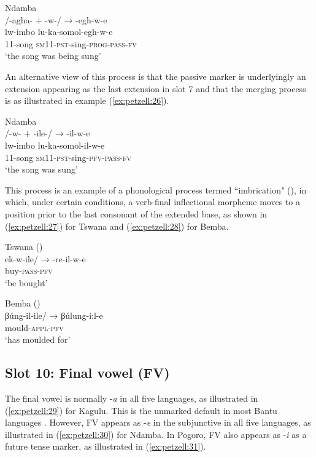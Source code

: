 \documentclass[output=paper,
            colorlinks, citecolor=brown
            ,draftmode
		  ]{langscibook}
\begin{document}
\ex\label{ex:petzell:25}Ndamba\\
{{/}}{}-agha- + -w-{{/}} → {}-egh-w-e   \\
\gll lw-imbo    lu-ka-somol-egh-w-e\\
11-song    \textsc{sm}11-\textsc{pst}{}-sing-\textsc{prog}{}-\textsc{pass}{}-\textsc{fv}\\
\glt `the song was being sung'
\z


{An alternative view of this process is that the passive marker is underlyingly an extension appearing as the last extension in slot 7 and that the merging process is as illustrated in example (\ref{ex:petzell:26}).}


\ea\label{ex:petzell:26}Ndamba\\
{{/}}{}-w- + -ile-{{/} }→ {}-il-w-e   \\
\gll lw-imbo  lu-ka-somol-il-w-e\\
11-song  \textsc{sm}11-\textsc{pst}{}-sing-\textsc{pfv}{}-\textsc{pass}{}-\textsc{fv}\\
\glt `the song was sung'
\z


{This process is an example of a phonological process termed “imbrication" (\citealt{Bastin1983, Kula2001, Chebanne1993}), in which, under certain conditions, a verb-final inflectional morpheme moves to a position prior to the last consonant of the extended base, as shown in (\ref{ex:petzell:27}) for Tswana and (\ref{ex:petzell:28}) for Bemba.}


\ea\label{ex:petzell:27}Tswana (\citealt[4]{Chebanne1993})\\
ek-w-ile{/}    → -re-il-w-e  \\
buy-\textsc{pass}{}-\textsc{pfv}\\
\glt `be bought'


\ex\label{ex:petzell:28} Bemba (\citealt[153]{Kula2002phd})\\
\gll {/}βúng-il-ile{/}    →   βúlung-i:l-e  \\
mould-\textsc{appl}{}-\textsc{pfv}\\
\glt `has moulded for'
\z

\subsection{Slot 10: Final vowel (FV)}
\label{sec:petzell:2.10}

The final vowel is normally -\textit{a} in all five languages, as illustrated in  (\ref{ex:petzell:29}) for Kagulu. This is the unmarked default in most Bantu languages \citep[261]{Nurse2008}. However, FV appears as \nobreakdash-\textit{e} in the subjunctive in all five languages, as illustrated in  (\ref{ex:petzell:30}) for Ndamba. In Pogoro, FV also appears as \nobreakdash-\textit{i} as a future tense marker, as illustrated in  (\ref{ex:petzell:31}).
\end{document}
